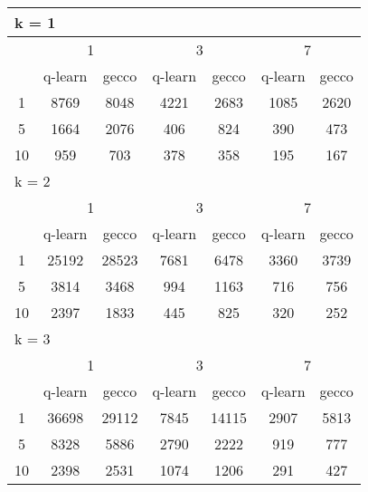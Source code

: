 \begin{table}
\begin{tabular}{|*7{c|}}
\hline
\multicolumn{7}{|l|}{k = 1} \\
\hline
\multirow{2}{*}{\diagbox{$\mu$}{$\lambda$}} & \multicolumn{2}{c|}{1} & \multicolumn{2}{c|}{3} & \multicolumn{2}{c|}{7} \\
\cline{2-7}
 & q-learn & gecco & q-learn & gecco & q-learn & gecco \\
\hline
1 & 8769 & 8048 & 4221 & 2683 & 1085 & 2620 \\
\hline
5 & 1664 & 2076 & 406 & 824 & 390 & 473 \\
\hline
10 & 959 & 703 & 378 & 358 & 195 & 167 \\
\hline
\multicolumn{7}{|l|}{k = 2} \\
\hline
\multirow{2}{*}{\diagbox{$\mu$}{$\lambda$}} & \multicolumn{2}{c|}{1} & \multicolumn{2}{c|}{3} & \multicolumn{2}{c|}{7} \\
\cline{2-7}
 & q-learn & gecco & q-learn & gecco & q-learn & gecco \\
\hline
1 & 25192 & 28523 & 7681 & 6478 & 3360 & 3739 \\
\hline
5 & 3814 & 3468 & 994 & 1163 & 716 & 756 \\
\hline
10 & 2397 & 1833 & 445 & 825 & 320 & 252 \\
\hline
\multicolumn{7}{|l|}{k = 3} \\
\hline
\multirow{2}{*}{\diagbox{$\mu$}{$\lambda$}} & \multicolumn{2}{c|}{1} & \multicolumn{2}{c|}{3} & \multicolumn{2}{c|}{7} \\
\cline{2-7}
 & q-learn & gecco & q-learn & gecco & q-learn & gecco \\
\hline
1 & 36698 & 29112 & 7845 & 14115 & 2907 & 5813 \\
\hline
5 & 8328 & 5886 & 2790 & 2222 & 919 & 777 \\
\hline
10 & 2398 & 2531 & 1074 & 1206 & 291 & 427 \\
\hline
\end{tabular}
\end{table}

